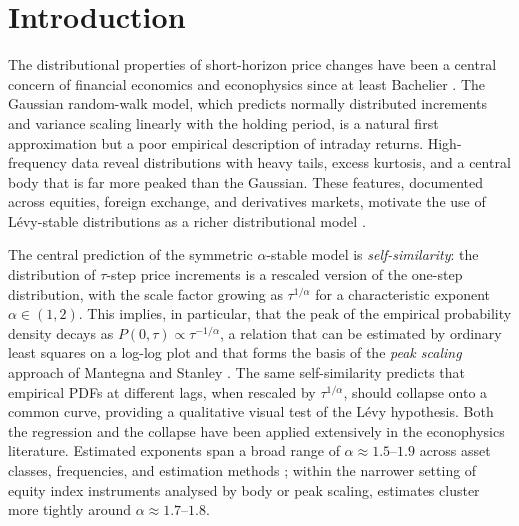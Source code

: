 \documentclass[12pt,a4paper]{article}
\begin{document}
\section{Introduction}
\label{sec:intro}

The distributional properties of short-horizon price changes have been a
central concern of financial economics and econophysics since at least
Bachelier \cite{Bachelier1900}. The Gaussian random-walk model, which predicts
normally distributed increments and variance scaling linearly with the holding
period, is a natural first approximation but a poor empirical description of
intraday returns. High-frequency data reveal distributions with heavy tails,
excess kurtosis, and a central body that is far more peaked than the Gaussian.
These features, documented across equities, foreign exchange, and derivatives
markets, motivate the use of Lévy-stable distributions as a richer
distributional model \cite{Mandelbrot1963,MantegnaStanley1994,Cont2001}.

The central prediction of the symmetric $\alpha$-stable model is
\textit{self-similarity}: the distribution of $\tau$-step price increments is
a rescaled version of the one-step distribution, with the scale factor growing
as $\tau^{1/\alpha}$ for a characteristic exponent $\alpha\in(1,2)$. This
implies, in particular, that the peak of the empirical probability density
decays as $P(0,\tau)\propto\tau^{-1/\alpha}$, a relation that can be estimated
by ordinary least squares on a log-log plot and that forms the basis of the
\textit{peak scaling} approach of Mantegna and Stanley \cite{MantegnaStanley1994,MantegnaStanley1995}.
The same self-similarity predicts that empirical PDFs at different lags, when
rescaled by $\tau^{1/\alpha}$, should collapse onto a common curve, providing
a qualitative visual test of the Lévy hypothesis. Both the regression and the
collapse have been applied extensively in the econophysics literature.
Estimated exponents span a broad range of $\alpha\approx 1.5$--$1.9$ across
asset classes, frequencies, and estimation methods
\cite{Gopikrishnan1999,Weron2001,BouchaudPotters2003}; within the narrower
setting of equity index instruments analysed by body or peak scaling,
estimates cluster more tightly around $\alpha\approx 1.7$--$1.8$.
\end{document}
